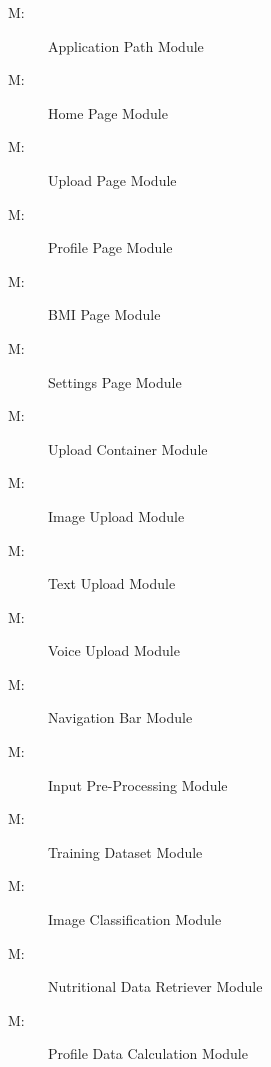 \documentclass[12pt, titlepage]{article}
\newcounter{mnum}
\newcommand{\mthemnum}{M\themnum}
\begin{document}
\begin{description}
\item [ \mthemnum \label{mAP}:] Application Path Module
\item  [ \mthemnum \label{mHP}:] Home Page Module
\item  [ \mthemnum \label{mUP}:] Upload Page Module
\item  [ \mthemnum \label{mPP}:] Profile Page Module
\item  [ \mthemnum \label{mBP}:] BMI Page Module
\item  [ \mthemnum \label{mSP}:] Settings Page Module
\item  [ \mthemnum \label{mUC}:] Upload Container Module
\item  [ \mthemnum \label{mIU}:] Image Upload Module
\item  [ \mthemnum \label{mTU}:] Text Upload Module
\item  [ \mthemnum \label{mVU}:] Voice Upload Module
\item  [ \mthemnum \label{mNB}:] Navigation Bar Module
\item  [ \mthemnum \label{mIP}:] Input Pre-Processing Module
\item  [ \mthemnum \label{mTD}:] Training Dataset Module
\item  [ \mthemnum \label{mIC}:] Image Classification Module
\item  [ \mthemnum \label{mNDR}:] Nutritional Data Retriever Module
\item  [ \mthemnum \label{mPDC}:] Profile Data Calculation 
Module
\end{description}
\end{document}
